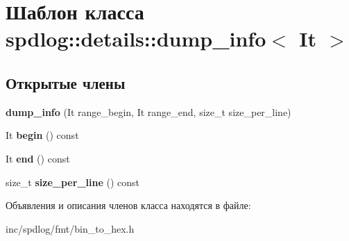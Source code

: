 \hypertarget{classspdlog_1_1details_1_1dump__info}{}\section{Шаблон класса spdlog\+:\+:details\+:\+:dump\+\_\+info$<$ It $>$}
\label{classspdlog_1_1details_1_1dump__info}
\subsection*{Открытые члены}
\begin{DoxyCompactItemize}
\item 
\mbox{\label{classspdlog_1_1details_1_1dump__info_a1f8b557e348eb511e8a29cdc0c8d63c8}} 
{\bfseries dump\+\_\+info} (It range\+\_\+begin, It range\+\_\+end, size\+\_\+t size\+\_\+per\+\_\+line)
\item 
\mbox{\label{classspdlog_1_1details_1_1dump__info_a08e9a2529b4398b5e95b30cb9b538717}} 
It {\bfseries begin} () const
\item 
\mbox{\label{classspdlog_1_1details_1_1dump__info_a646713aae6e589276dd0ac2cd97cbca6}} 
It {\bfseries end} () const
\item 
\mbox{\label{classspdlog_1_1details_1_1dump__info_a69f5143d059d1d681574a04b2efc288d}} 
size\+\_\+t {\bfseries size\+\_\+per\+\_\+line} () const
\end{DoxyCompactItemize}


Объявления и описания членов класса находятся в файле\+:\begin{DoxyCompactItemize}
\item 
inc/spdlog/fmt/bin\+\_\+to\+\_\+hex.\+h\end{DoxyCompactItemize}
